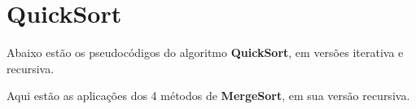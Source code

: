 \section{QuickSort}
Abaixo estão os pseudocódigos do algoritmo \textbf{QuickSort}, em versões iterativa e recursiva.


Aqui estão as aplicações dos 4 métodos de \textbf{MergeSort}, em sua versão recursiva.

